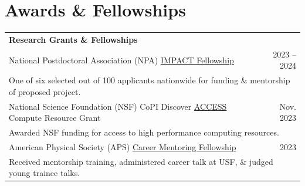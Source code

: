 \documentclass[letterpaper,11pt]{article}
\begin{document}
\section*{Awards \& Fellowships}
\vspace{-0.5\baselineskip}
\begin{longtable}{@{}p{}r@{}}
  \multicolumn{2}{l}{\hspace{-3mm} \bf{Research Grants \& Fellowships}} 	                                                                                                                                                                                        \\ [5pt]
  \hspace{3mm} National Postdoctoral Association (NPA) \href{https://www.nationalpostdoc.org/general/custom.asp?page=IMPACTProgram}{IMPACT Fellowship}                                                                                                   & 2023 -- 2024 \\ [2pt]
    \multicolumn{2}{l}{\hspace{4mm} One of six selected out of 100 applicants nationwide for funding \& mentorship of proposed project.}                                                                                                                                \\ [6pt]
  \hspace{3mm} National Science Foundation (NSF) CoPI Discover \href{https://access-ci.org/}{ACCESS} Compute Resource Grant                                                                                                                              & Nov. 2023    \\ [2pt]
    \multicolumn{2}{l}{\hspace{4mm} Awarded NSF funding for access to high performance computing resources.}                                                                                                                                                            \\ [6pt]
  \hspace{3mm} American Physical Society (APS) \href{https://www.aps.org/careers/guidance/mentoring.cfm}{Career Mentoring Fellowship}                                                                                                                    & 2023         \\ [2pt]
    \multicolumn{2}{l}{\hspace{4mm} Received mentorship training, administered career talk at USF, \& judged young trainee talks.}                                                                                                                                      \\ [10pt]

\end{longtable}
\end{document}
